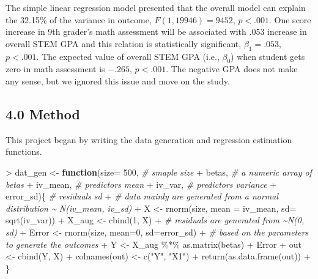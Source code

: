 \documentclass[
]{article}
\newenvironment{Shaded}{\begin{snugshade}}{\end{snugshade}}
\newcommand{\AttributeTok}[1]{\textcolor[rgb]{0.77,0.63,0.00}{#1}}
\newcommand{\CommentTok}[1]{\textcolor[rgb]{0.56,0.35,0.01}{\textit{#1}}}
\newcommand{\ControlFlowTok}[1]{\textcolor[rgb]{0.13,0.29,0.53}{\textbf{#1}}}
\newcommand{\DecValTok}[1]{\textcolor[rgb]{0.00,0.00,0.81}{#1}}
\newcommand{\FunctionTok}[1]{\textcolor[rgb]{0.00,0.00,0.00}{#1}}
\newcommand{\NormalTok}[1]{#1}
\newcommand{\OtherTok}[1]{\textcolor[rgb]{0.56,0.35,0.01}{#1}}
\newcommand{\SpecialCharTok}[1]{\textcolor[rgb]{0.00,0.00,0.00}{#1}}
\newcommand{\StringTok}[1]{\textcolor[rgb]{0.31,0.60,0.02}{#1}}
\begin{document}
The simple linear regression model presented that the overall model can
explain the 32.15\% of the variance in outcome, \(F(1,19946)=9452\),
\(p < .001\). One score increase in 9th grader's math assessment will be
associated with .053 increase in overall STEM GPA and this relation is
statistically significant, \(\beta_1=.053\), \(p <.001\). The expected
value of overall STEM GPA (i.e., \(\beta_0\)) when student gets zero in
math assessment is \(-.265\), \(p <.001\). The negative GPA does not
make any sense, but we ignored this issue and move on the study.

\hypertarget{method}{%
\subsection{4.0 Method}\label{method}}

This project began by writing the data generation and regression
estimation functions.

\begin{Shaded}
\begin{Highlighting}[]
\SpecialCharTok{\textgreater{}}\NormalTok{ dat\_gen }\OtherTok{\textless{}{-}} \ControlFlowTok{function}\NormalTok{(}\AttributeTok{size=} \DecValTok{500}\NormalTok{,  }\CommentTok{\# smaple size}
\SpecialCharTok{+}\NormalTok{                     betas,      }\CommentTok{\# a numeric array of betas}
\SpecialCharTok{+}\NormalTok{                     iv\_mean,    }\CommentTok{\# predictor\textquotesingle{}s mean}
\SpecialCharTok{+}\NormalTok{                     iv\_var,     }\CommentTok{\# predictor\textquotesingle{}s variance}
\SpecialCharTok{+}\NormalTok{                     error\_sd)\{  }\CommentTok{\# residuals\textquotesingle{} sd}
\SpecialCharTok{+}   \CommentTok{\# data mainly are generated from a normal distribution \textasciitilde{} N(iv\_mean, iv\_sd)}
\SpecialCharTok{+}\NormalTok{   X }\OtherTok{\textless{}{-}} \FunctionTok{rnorm}\NormalTok{(size, }\AttributeTok{mean =}\NormalTok{ iv\_mean, }\AttributeTok{sd=} \FunctionTok{sqrt}\NormalTok{(iv\_var))}
\SpecialCharTok{+}\NormalTok{   X\_aug }\OtherTok{\textless{}{-}} \FunctionTok{cbind}\NormalTok{(}\DecValTok{1}\NormalTok{, X)}
\SpecialCharTok{+}   \CommentTok{\# residuals are generated from \textasciitilde{}N(0, sd)}
\SpecialCharTok{+}\NormalTok{   Error }\OtherTok{\textless{}{-}} \FunctionTok{rnorm}\NormalTok{(size, }\AttributeTok{mean=}\DecValTok{0}\NormalTok{, }\AttributeTok{sd=}\NormalTok{error\_sd)}
\SpecialCharTok{+}   \CommentTok{\# based on the parameters to generate the outcomes}
\SpecialCharTok{+}\NormalTok{   Y }\OtherTok{\textless{}{-}}\NormalTok{ X\_aug }\SpecialCharTok{\%*\%} \FunctionTok{as.matrix}\NormalTok{(betas) }\SpecialCharTok{+}\NormalTok{ Error}
\SpecialCharTok{+}\NormalTok{   out }\OtherTok{\textless{}{-}} \FunctionTok{cbind}\NormalTok{(Y, X)}
\SpecialCharTok{+}   \FunctionTok{colnames}\NormalTok{(out) }\OtherTok{\textless{}{-}} \FunctionTok{c}\NormalTok{(}\StringTok{"Y"}\NormalTok{, }\StringTok{"X1"}\NormalTok{)}
\SpecialCharTok{+}   \FunctionTok{return}\NormalTok{(}\FunctionTok{as.data.frame}\NormalTok{(out))}
\SpecialCharTok{+}\NormalTok{ \}}
\end{Highlighting}
\end{Shaded}
\end{document}
